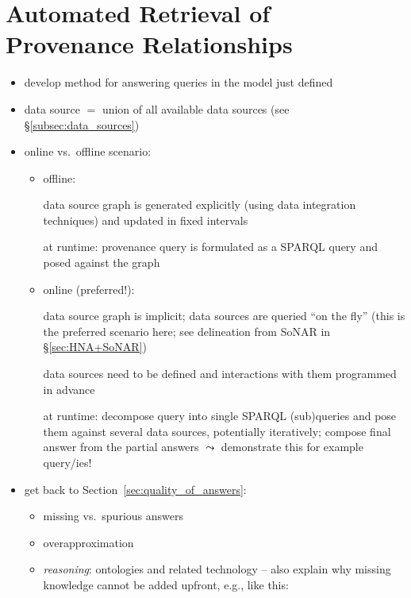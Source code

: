 \chapter{Automated Retrieval of Provenance Relationships}
\label{chap:retrieval}

\begin{itemize}
  \item
    develop method for answering queries in the model just defined
  \item
    data source $=$ union of all available data sources (see §\ref{subsec:data_sources})
  \item
    online vs.\ off{}line scenario:
    \begin{itemize}
      \item
        off{}line: 
        
        data source graph is generated explicitly (using data integration techniques)
        and updated in fixed intervals
                
        at runtime: provenance query is formulated as a \gls{SPARQL} query and posed against the graph
      \item
        online (preferred!):
        
        data source graph is implicit; data sources are queried \enquote{on the fly}
        (this is the preferred scenario here; see delineation from SoNAR in §\ref{sec:HNA+SoNAR})
        
        data sources need to be defined and
        interactions with them programmed in advance
        
        at runtime: decompose query into single \gls{SPARQL} (sub)queries and pose them against several data sources,
        potentially iteratively;
        compose final answer from the partial answers
        $\leadsto$ demonstrate this for example query/ies!
    \end{itemize}
  \item
    get back to Section~\ref{sec:quality_of_answers}:
    \begin{itemize}
      \item
        missing vs.\ spurious answers
      \item
        overapproximation
      \item
        \emph{reasoning}: ontologies and related technology -- also explain why
        missing knowledge cannot be added upfront, e.g., like this:
        

\end{itemize}
\end{itemize}
